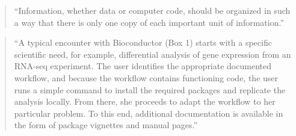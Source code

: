 \documentclass[]{tufte-book}
\begin{document}
\begin{quote}
``Information, whether data or computer code, should be organized in such a way that
there is only one copy of each important unit of information.'' \citep{murrell2009introduction}
\end{quote}

\begin{quote}
``A typical encounter with Bioconductor (Box 1) starts with a specific scientific need, for example, differential analysis of gene expression
from an RNA-seq experiment. The user identifies the appropriate
documented workflow, and because the workflow contains functioning code, the user runs a simple command to install the required
packages and replicate the analysis locally. From there, she proceeds
to adapt the workflow to her particular problem. To this end, additional documentation is available in the form of package vignettes
and manual pages.'' \citep{huber2015orchestrating}
\end{quote}
\end{document}
